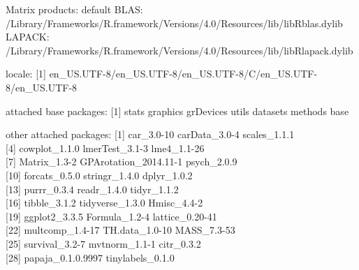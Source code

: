 \documentclass[
  english,
  man, noextraspace]{apa7}
\begin{document}
\begin{appendix}
Matrix products: default BLAS:
/Library/Frameworks/R.framework/Versions/4.0/Resources/lib/libRblas.dylib
LAPACK:
/Library/Frameworks/R.framework/Versions/4.0/Resources/lib/libRlapack.dylib

locale: {[}1{]}
en\_US.UTF-8/en\_US.UTF-8/en\_US.UTF-8/C/en\_US.UTF-8/en\_US.UTF-8

attached base packages: {[}1{]} stats graphics grDevices utils datasets
methods base

other attached packages: {[}1{]} car\_3.0-10 carData\_3.0-4
scales\_1.1.1\\
{[}4{]} cowplot\_1.1.0 lmerTest\_3.1-3 lme4\_1.1-26\\
{[}7{]} Matrix\_1.3-2 GPArotation\_2014.11-1 psych\_2.0.9\\
{[}10{]} forcats\_0.5.0 stringr\_1.4.0 dplyr\_1.0.2\\
{[}13{]} purrr\_0.3.4 readr\_1.4.0 tidyr\_1.1.2\\
{[}16{]} tibble\_3.1.2 tidyverse\_1.3.0 Hmisc\_4.4-2\\
{[}19{]} ggplot2\_3.3.5 Formula\_1.2-4 lattice\_0.20-41\\
{[}22{]} multcomp\_1.4-17 TH.data\_1.0-10 MASS\_7.3-53\\
{[}25{]} survival\_3.2-7 mvtnorm\_1.1-1 citr\_0.3.2\\
{[}28{]} papaja\_0.1.0.9997 tinylabels\_0.1.0


\end{appendix}
\end{document}
